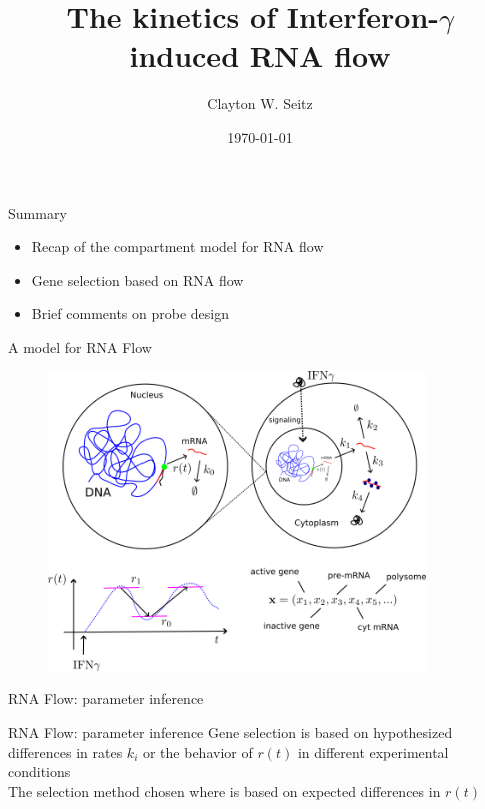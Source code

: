 \documentclass[aspectratio=1610]{beamer}					%
\title{The kinetics of Interferon-$\gamma$ induced RNA flow}	%
\author{Clayton W. Seitz}								%
\date{\today}									%
\begin{document}
\begin{frame}
  \titlepage
\end{frame}


%

\begin{frame}{Summary}
\begin{itemize}
\item Recap of the compartment model for RNA flow
\item Gene selection based on RNA flow
\item Brief comments on probe design
\end{itemize}
\end{frame}

\begin{frame}{A model for RNA Flow}
\begin{figure}
\includegraphics[width=10cm]{RNAFlow.png}
\end{figure}
\end{frame}


\begin{frame}{RNA Flow: parameter inference}
\end{frame}


\begin{frame}{RNA Flow: parameter inference}
Gene selection is based on hypothesized differences in rates $k_{i}$ or the behavior of $r(t)$ in different experimental conditions\\
\vspace{0.2in}
The selection method chosen where is based on expected differences in $r(t)$
\end{frame}
\end{document}
